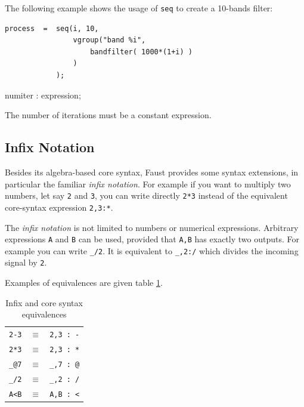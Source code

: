 The following example shows the usage of  \lstinline'seq' to create a 10-bands filter:

\begin{lstlisting}
process  =	seq(i, 10, 
				vgroup("band %i", 
					bandfilter( 1000*(1+i) ) 
				) 
			);
\end{lstlisting}

\begin{rail}
numiter : expression;
\end{rail}
The number of iterations must be a constant expression. 

\subsection{Infix Notation}

Besides its algebra-based core syntax, Faust provides some syntax extensions, in particular the familiar \emph{infix notation}. For example if you want to multiply two numbers, let say \lstinline'2' and \lstinline'3', you can write directly \lstinline'2*3' instead of the equivalent core-syntax expression \lstinline'2,3:*'.

The \emph{infix notation} is not limited to numbers or numerical expressions. Arbitrary expressions \lstinline'A' and \lstinline'B' can be used, provided that \lstinline'A,B' has exactly two outputs. For example you can write \lstinline'_/2'. It is equivalent to \lstinline'_,2:/' which divides the incoming signal by \lstinline'2'. 

Examples of equivalences are given table \ref{tab-infixrules}.

\begin{table}[h]
	\begin{center}
	\begin{tabular}{|rcl|}
	\hline
	\lstinline'2-3' & $\equiv$ & \lstinline'2,3 : -'\\
	\lstinline'2*3' & $\equiv$ & \lstinline'2,3 : *'\\
	\lstinline'_@7' & $\equiv$ & \lstinline'_,7 : @'\\
	\lstinline'_/2' & $\equiv$ & \lstinline'_,2 : /'\\
	\lstinline'A<B' & $\equiv$ & \lstinline'A,B : <'\\
	\hline
	\end{tabular}
	\end{center}
	\caption{Infix and core syntax equivalences}
	\label{tab-infixrules}
\end{table}

